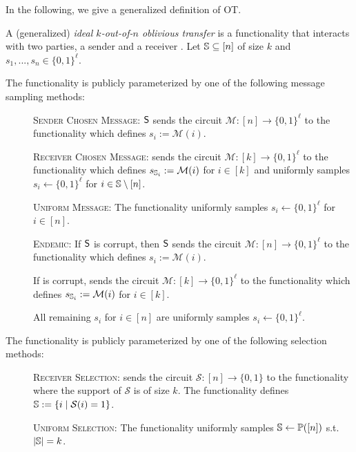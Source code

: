 In the following, we give a generalized definition of OT.

\begin{definition}\label{def:got}
	A (generalized) \emph{ideal $k$-out-of-$n$ oblivious transfer} is a functionality that interacts with two parties, a sender \send and a receiver \rec. Let $\mathsf{\mathbb S}\subseteq[n]$ of size $k$ and  $s_1,...,s_n\in \{0,1\}^\ell$.
	
	The functionality is publicly parameterized by one of the following message sampling methods:
	\begin{description}
		\item[] \textsc{Sender Chosen Message:} $\mathsf{S}$ sends the circuit $\mathcal{M} : [n] \rightarrow \{0,1\}^\ell$ to the functionality which defines $s_i:=\mathcal{M}(i)$.
		
		\item[] \textsc{Receiver Chosen Message:} \rec sends the circuit  $\mathcal{M} : [k] \rightarrow \{0,1\}^\ell$ to the functionality which defines $s_{\mathsf{\mathbb S}_i}:=\mathcal{M}(i)$ for $i\in[k]$ and uniformly samples $s_i\gets\{0,1\}^\ell$ for $i\in\mathsf{\mathbb S}\setminus[n]$.
		
		\item[] \textsc{Uniform Message:} The functionality uniformly samples $s_i\gets\{0,1\}^{\ell}$ for $i\in[n]$. 
		
		\item[] \textsc{Endemic:} If $\mathsf{S}$ is corrupt, then $\mathsf{S}$ sends the circuit $\mathcal{M} : [n] \rightarrow \{0,1\}^\ell$ to the functionality which defines $s_i:=\mathcal{M}(i)$.
		
		If \rec is corrupt, \rec sends the circuit  $\mathcal{M} : [k] \rightarrow \{0,1\}^\ell$ to the functionality which defines $s_{\mathsf{\mathbb S}_i}:=\mathcal{M}(i)$ for $i\in[k]$.
		
		All remaining $s_i$ for $i\in [n]$ are uniformly samples $s_i\gets\{0,1\}^\ell$.
	\end{description}
	
	The functionality is publicly parameterized by one of the following selection methods:
	\begin{description}
		\item[] \textsc{Receiver Selection:} \rec sends the circuit $\mathcal{S}:[n]\rightarrow\{0,1\}$ to the functionality where the support of $\mathcal{S}$ is of size $k$. The functionality defines $\mathsf{\mathbb S}:=\{i \mid \mathcal{S}(i)=1\}$.
		\item[] \textsc{Uniform Selection:} The functionality uniformly samples $\mathsf{\mathbb S}\gets\mathbb{P}([n])$ s.t. $|\mathsf{\mathbb S}|=k$.
	\end{description}
	

\end{definition}
